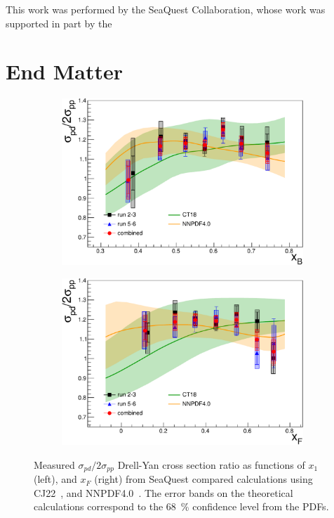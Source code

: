 \documentclass[reprint,aps,unsortedaddress,superscriptaddress,prl,floatfix,showpacs,linenumbers]{revtex4-2}
\begin{document}
\begin{acknowledgments}
	This work was performed by the SeaQuest Collaboration, whose work was supported in part by the
\end{acknowledgments}


\appendix
\section{End Matter}

\begin{figure}[htbp!]
	\begin{subfigure}{0.45\linewidth}
		\includegraphics[width=\linewidth]{data_full_xB_syst.pdf}
	\end{subfigure}
	\begin{subfigure}{0.45\linewidth}
		\includegraphics[width=\linewidth]{data_full_xF_syst.pdf}
	\end{subfigure}
	\caption{Measured $\sigma_{pd}/2\sigma_{pp}$ Drell-Yan cross section ratio as functions of $x_1$ (left), and $x_F$ (right) 
		from SeaQuest compared calculations using
		CJ22~\cite{accardi2023}, and NNPDF4.0~\cite{ball2022a}.
		The error bands on the theoretical calculations correspond to the \SI{68}{\percent} confidence level from the PDFs.}
	\label{fig:csr_x1_xF}
\end{figure}
\end{document}
